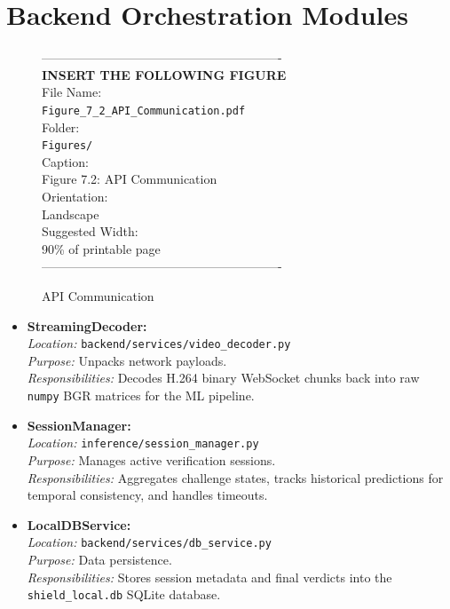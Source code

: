 \documentclass[12pt, a4paper]{report}
\begin{document}
\section{Backend Orchestration Modules}
\vspace{1em}
\begin{figure}[htbp]
\begin{center}
----------------------------------------------------------\\
\vspace{0.5em}
\textbf{INSERT THE FOLLOWING FIGURE}\\
\vspace{1em}
File Name:\\
\texttt{Figure\_7\_2\_API\_Communication.pdf}\\
\vspace{1em}
Folder:\\
\texttt{Figures/}\\
\vspace{1em}
Caption:\\
Figure 7.2: API Communication\\
\vspace{1em}
Orientation:\\
Landscape\\
\vspace{1em}
Suggested Width:\\
90\% of printable page\\
\vspace{3cm}
----------------------------------------------------------
\end{center}
\caption{API Communication}
\label{fig:diag_13}
\end{figure}
\vspace{1em}
\begin{itemize}
    \item \textbf{StreamingDecoder:} \\
    \textit{Location:} \texttt{backend/services/video\_decoder.py} \\
    \textit{Purpose:} Unpacks network payloads. \\
    \textit{Responsibilities:} Decodes H.264 binary WebSocket chunks back into raw \texttt{numpy} BGR matrices for the ML pipeline.
    
    \item \textbf{SessionManager:} \\
    \textit{Location:} \texttt{inference/session\_manager.py} \\
    \textit{Purpose:} Manages active verification sessions. \\
    \textit{Responsibilities:} Aggregates challenge states, tracks historical predictions for temporal consistency, and handles timeouts.
    
    \item \textbf{LocalDBService:} \\
    \textit{Location:} \texttt{backend/services/db\_service.py} \\
    \textit{Purpose:} Data persistence. \\
    \textit{Responsibilities:} Stores session metadata and final verdicts into the \texttt{shield\_local.db} SQLite database.
\end{itemize}
\end{document}
